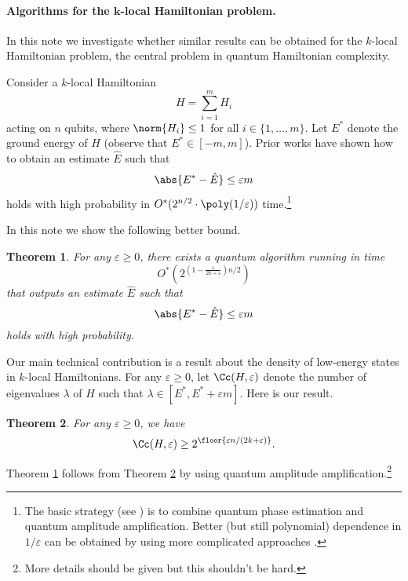 \documentclass[11pt,a4paper]{article}
\theoremstyle{plain}
\newtheorem{theorem}{Theorem}
\theoremstyle{definition}
\begin{document}
\paragraph{Algorithms for the $\boldsymbol{k}$-local Hamiltonian problem.}
In this note we investigate whether similar results can be obtained for the $k$-local Hamiltonian problem, the central problem in quantum Hamiltonian complexity.

Consider a $k$-local Hamiltonian
\[
H=\sum_{i=1}^m H_i
\]
acting on $n$ qubits, where $\norm{H_i}\le 1$ for all $i\in\{1,\ldots,m\}$. Let $E^\ast$ denote the ground energy of $H$ (observe that $E^\ast\in[-m,m]$). Prior works \cite{Apeldoorn+20,Ge+19,Kerzner+23,Lin+20,Poulin+09} have shown how to obtain an estimate $\hat E$ such that 
\[
\abs{E^\ast-\hat E}\le \varepsilon m
\]
holds with high probability in $O^\ast(2^{n/2}\cdot \poly(1/\varepsilon))$ time.\footnote{The basic strategy (see \cite{Apeldoorn+20,Kerzner+23}) is to combine quantum phase estimation and quantum amplitude amplification. Better (but still polynomial) dependence in $1/\varepsilon$ can be obtained by using more complicated approaches \cite{Ge+19,Lin+20,Poulin+09}.}


In this note we show the following better bound.
\begin{theorem}\label{th:alg}
	For any $\varepsilon\ge 0$, there exists a quantum algorithm running in time
	\begin{equation}\label{eq:th}
	O^\ast\left(2^{\left(1-\frac{\varepsilon}{2k+\varepsilon}\right)n/2}\right)
	\end{equation}
	that outputs an estimate $\hat E$ such that 
	\[
	\abs{E^\ast-\hat E}\le \varepsilon m
	\]
	holds with high probability.
\end{theorem}

Our main technical contribution is a result about the density of low-energy states in $k$-local Hamiltonians. For any $\varepsilon\ge 0$, let $\Cc(H,\varepsilon)$ denote the number of eigenvalues $\lambda$ of $H$ such that $\lambda\in [E^\ast,E^\ast+\varepsilon m]$. Here is our result.
\begin{theorem}\label{th:main}
For any $\varepsilon\ge 0$, we have 
\[
\Cc(H,\varepsilon)\ge 2^{\floor{\varepsilon n/(2k+\varepsilon)}}.
\]
\end{theorem}
Theorem \ref{th:alg} follows from Theorem \ref{th:main} by using quantum amplitude amplification.\footnote{More details should be given but this shouldn't be hard.}
\end{document}
